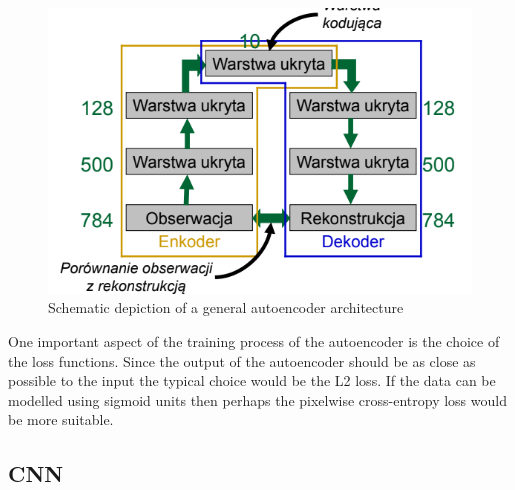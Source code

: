 \documentclass[a5paper]{article}
\begin{document}
\begin{figure}[ht]
   \centering
   \includegraphics[width=0.75\columnwidth]{figs/autoencoder.png}
   \caption{Schematic depiction of a general autoencoder architecture \cite{Kurdziel}}
   \label{fig:ae}
\end{figure}

One important aspect of the training process of the autoencoder is the choice of the loss functions.
Since the output of the autoencoder should be as close as possible to the input the typical choice
would be the L2 loss. If the data can be modelled using sigmoid units then perhaps the pixelwise
cross-entropy loss would be more suitable.

\subsection{CNN}
\end{document}
